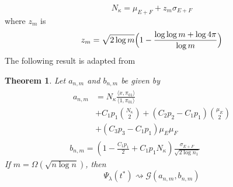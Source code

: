 \documentclass[draftcls]{IEEEtran}
\newtheorem{theorem}{Theorem}
\theoremstyle{definition}
\begin{document}
\begin{equation}
  \label{eq:18}
  N_{\kappa} = \mu_{E + F} + z_m \sigma_{E + F}
\end{equation}
where $z_m$ is
\begin{equation*}
  z_m = \sqrt{2 \log m}\Bigl(1 - \frac{\log{\log{m}} + \log{4
      \pi}}{\log{m}}\Bigr)
\end{equation*}
The following result is adapted from \cite{rukhin:_limit_distr_graph_scan_statis}
\begin{theorem}
  \label{thm:3}
  Let $a_{n,m}$ and $b_{n,m}$ be given by
  \begin{gather}
    \label{eq:28}
    \begin{split}
    a_{n,m} &= N_{\kappa} \frac{\langle x, \pi_{01} \rangle}{\langle 1, \pi_{01} \rangle} \\ &+ C_1 p_1 \binom{N_\kappa}{2} + (C_2 p_2 -
    C_1 p_1)\binom{\mu_E}{2} \\ &+ (C_3 p_3 - C_1 p_1)\mu_E \mu_F 
    \end{split} \\
    b_{n,m} = (1 - \tfrac{C_1 p_1}{2} + C_1 p_1
    N_\kappa)\frac{\sigma_{E + F}}{\sqrt{2 \log{n_1}}}
  \end{gather}
  If $m = \Omega(\sqrt{n \log n})$, then
  \begin{equation}
    \label{eq:29}
    \Psi_{\lambda}(t^{*}) \rightsquigarrow \mathcal{G}(a_{n,m}, b_{n,m})
  \end{equation}
\end{theorem}
\appendices
\end{document}
